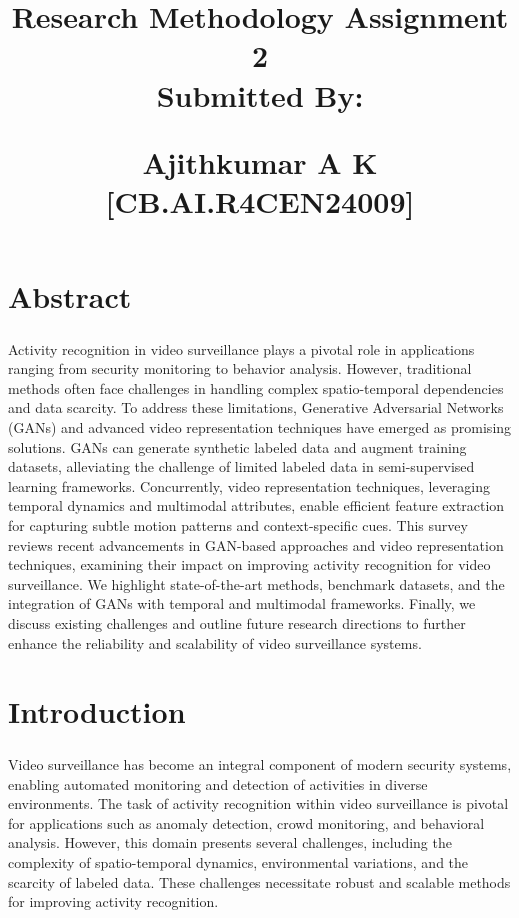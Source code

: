 \documentclass[11pt,a4paper]{report}
\title{
\vspace{-3.4cm}
\begin{center}
{\Large \textbf{Research Methodology Assignment 2}}\\
\vspace{0.5cm}
Submitted By:\\
\vspace{0.2cm}
\begin{large}
{\textbf{Ajithkumar A K}}\\
\textbf{[CB.AI.R4CEN24009]}\\
\end{large}
\end{center}
}
\begin{document}
\maketitle

\chapter{Abstract}

\paragraph{ } 
Activity recognition in video surveillance plays a pivotal role in applications ranging from security monitoring to behavior analysis. However, traditional methods often face challenges in handling complex spatio-temporal dependencies and data scarcity. To address these limitations, Generative Adversarial Networks (GANs) and advanced video representation techniques have emerged as promising solutions. GANs can generate synthetic labeled data and augment training datasets, alleviating the challenge of limited labeled data in semi-supervised learning frameworks. Concurrently, video representation techniques, leveraging temporal dynamics and multimodal attributes, enable efficient feature extraction for capturing subtle motion patterns and context-specific cues. This survey reviews recent advancements in GAN-based approaches and video representation techniques, examining their impact on improving activity recognition for video surveillance. We highlight state-of-the-art methods, benchmark datasets, and the integration of GANs with temporal and multimodal frameworks. Finally, we discuss existing challenges and outline future research directions to further enhance the reliability and scalability of video surveillance systems.

\chapter{Introduction}

\paragraph{ } 
Video surveillance has become an integral component of modern security systems, enabling automated monitoring and detection of activities in diverse environments. The task of activity recognition within video surveillance is pivotal for applications such as anomaly detection, crowd monitoring, and behavioral analysis. However, this domain presents several challenges, including the complexity of spatio-temporal dynamics, environmental variations, and the scarcity of labeled data. These challenges necessitate robust and scalable methods for improving activity recognition.
\end{document}
